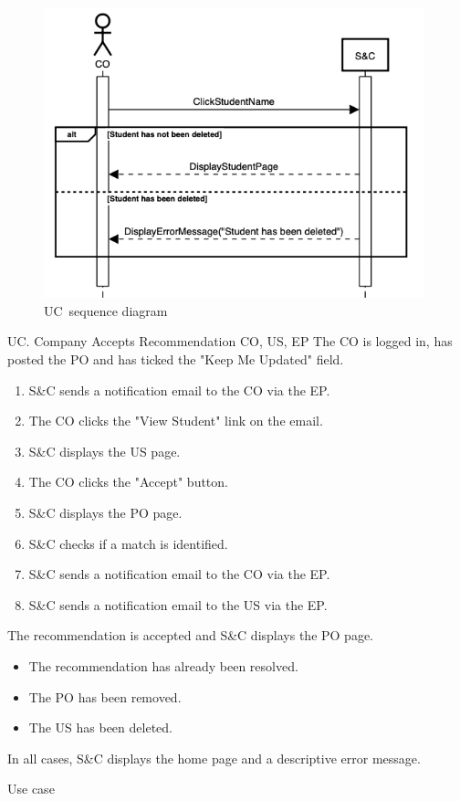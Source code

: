 \begin{figure}[h]
    \centering
    \includegraphics[width=11cm]{images/sequence-diagrams/company-views-student.png}
    \caption{UC\theuc\ sequence diagram}
\end{figure}


\clearpage
\begin{usecase}
    {UC\theuc. Company Accepts Recommendation}
    {CO, US, EP}
    {The CO is logged in, has posted the PO and has ticked the "Keep Me Updated" field.}
    {\begin{enumerate}[leftmargin=*]
        \item S\&C sends a notification email to the CO via the EP.
        \item The CO clicks the "View Student" link on the email.
        \item S\&C displays the US page.
        \item The CO clicks the "Accept" button.
        \item S\&C displays the PO page.
        \item S\&C checks if a match is identified.
        \item S\&C sends a notification email to the CO via the EP.
        \item S\&C sends a notification email to the US via the EP.
    \end{enumerate}}
    {The recommendation is accepted and S\&C displays the PO page.}
    {\begin{itemize}[leftmargin=*, label=\tiny\textbullet]
        \item The recommendation has already been resolved.
        \item The PO has been removed.
        \item The US has been deleted.
    \end{itemize}
    In all cases, S\&C displays the home page and a descriptive error message.}
    {Use case \theuc}
\end{usecase}

